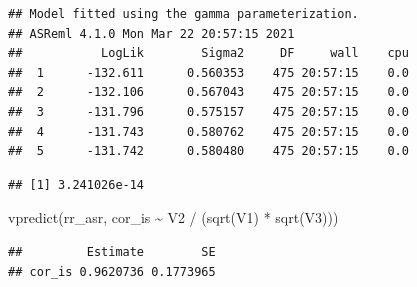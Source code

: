 \documentclass[
  12pt,
]{book}
\newenvironment{Shaded}{\begin{snugshade}}{\end{snugshade}}
\newcommand{\AttributeTok}[1]{\textcolor[rgb]{0.77,0.63,0.00}{#1}}
\newcommand{\ConstantTok}[1]{\textcolor[rgb]{0.00,0.00,0.00}{#1}}
\newcommand{\DecValTok}[1]{\textcolor[rgb]{0.00,0.00,0.81}{#1}}
\newcommand{\FunctionTok}[1]{\textcolor[rgb]{0.00,0.00,0.00}{#1}}
\newcommand{\NormalTok}[1]{#1}
\newcommand{\OtherTok}[1]{\textcolor[rgb]{0.56,0.35,0.01}{#1}}
\newcommand{\SpecialCharTok}[1]{\textcolor[rgb]{0.00,0.00,0.00}{#1}}
\newcommand{\StringTok}[1]{\textcolor[rgb]{0.31,0.60,0.02}{#1}}
\begin{document}
\begin{verbatim}
## Model fitted using the gamma parameterization.
## ASReml 4.1.0 Mon Mar 22 20:57:15 2021
##           LogLik        Sigma2     DF     wall    cpu
##  1      -132.611      0.560353    475 20:57:15    0.0
##  2      -132.106      0.567043    475 20:57:15    0.0
##  3      -131.796      0.575157    475 20:57:15    0.0
##  4      -131.743      0.580762    475 20:57:15    0.0
##  5      -131.742      0.580480    475 20:57:15    0.0
\end{verbatim}

\begin{Shaded}
\end{Shaded}

\begin{verbatim}
## [1] 3.241026e-14
\end{verbatim}

\begin{Shaded}
\begin{Highlighting}[]
\FunctionTok{vpredict}\NormalTok{(rr\_asr, cor\_is }\SpecialCharTok{\textasciitilde{}}\NormalTok{ V2 }\SpecialCharTok{/}\NormalTok{ (}\FunctionTok{sqrt}\NormalTok{(V1) }\SpecialCharTok{*} \FunctionTok{sqrt}\NormalTok{(V3)))}
\end{Highlighting}
\end{Shaded}

\begin{verbatim}
##         Estimate        SE
## cor_is 0.9620736 0.1773965
\end{verbatim}

\begin{Shaded}
\end{Shaded}
\end{document}
